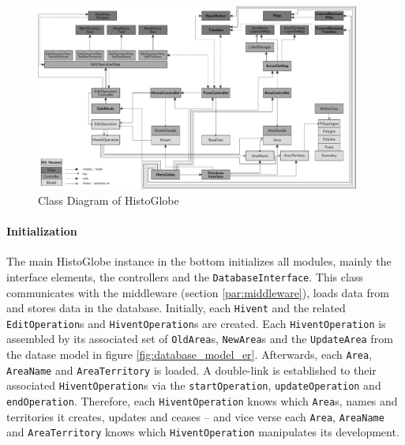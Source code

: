 \begin{figure}
  \centering
  \includegraphics[width=0.95\textwidth]{graphics/development/application/class_diagram}
  \vspace{1em}
  \caption{Class Diagram of HistoGlobe}
  \label{fig:class_diagram}
\end{figure}

\newpage %
\paragraph{Initialization} %
\label{par:initialization}

The main HistoGlobe instance in the bottom initializes all modules, mainly the interface elements, the controllers and the \texttt{DatabaseInterface}. This class communicates with the middleware (section \ref{par:middleware}), loads data from and stores data in the database. Initially, each \texttt{Hivent} and the related \texttt{EditOperation}s and \texttt{HiventOperation}s are created. Each \texttt{HiventOperation} is assembled by its associated set of \texttt{OldArea}s, \texttt{NewArea}s and the \texttt{UpdateArea} from the datase model in  figure \ref{fig:database_model_er}. Afterwards, each \texttt{Area}, \texttt{AreaName} and \texttt{AreaTerritory} is loaded. A double-link is established to their associated \texttt{HiventOperation}s via the \texttt{startOperation}, \texttt{updateOperation} and \texttt{endOperation}. Therefore, each \texttt{HiventOperation} knows which \texttt{Area}s, names and territories it creates, updates and ceases -- and vice verse each \texttt{Area}, \texttt{AreaName} and \texttt{AreaTerritory} knows which \texttt{HiventOperation} manipulates its development.

